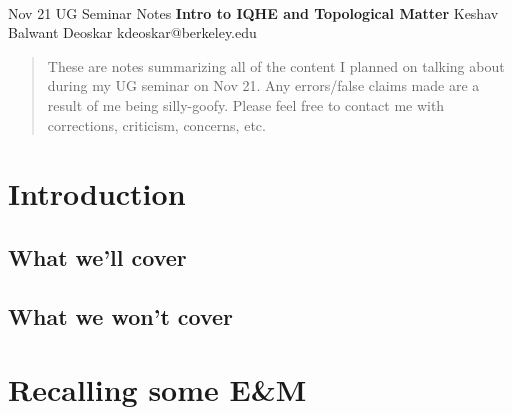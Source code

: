 \documentclass[11pt]{article}
\begin{document}
\thispagestyle{empty}
\bigskip \
\vspace{0.1cm}

\begin{center}
{\fontsize{18}{18} \selectfont Nov 21 UG Seminar Notes}
\vskip 16pt
{\fontsize{22}{22} \selectfont \bf \sffamily Intro to IQHE and Topological Matter}
\vskip 24pt
{\fontsize{16}{16} \selectfont \rmfamily Keshav Balwant Deoskar} 
\vskip 6pt
{\fontsize{14}{14} \selectfont \ttfamily kdeoskar@berkeley.edu} 
\vskip 24pt
\end{center}

\begin{abstract}
These are notes summarizing all of the content I planned on talking about during my UG seminar on Nov 21. Any errors/false claims made are a result of me being silly-goofy. Please feel free to contact me with corrections, criticism, concerns, etc.
\end{abstract}

\microtoc
\newpage




\newpage
\section{Introduction}

\cite{MooreMoessner21}

\subsection{What we'll cover}


\subsection{What we won't cover}

\newpage
\section{Recalling some E\&M}

\newpage
\end{document}
